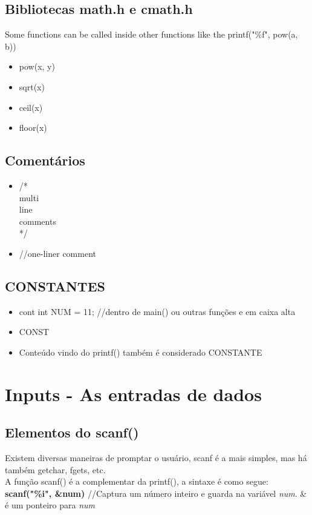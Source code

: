 \documentclass[12pt,a4paper]{article} %
\begin{document}
\subsection{Bibliotecas math.h e cmath.h}
Some functions can be called inside other functions like the printf("\%f", pow(a, b))
\begin{itemize}
\item pow(x, y)
\item sqrt(x)
\item ceil(x)
\item floor(x)
\end{itemize}

\subsection{Comentários}
\begin{itemize}
\item /*\\multi\\line\\comments\\ */
\item //one-liner comment
\end{itemize}

\subsection{CONSTANTES}
\begin{itemize}
\item cont int NUM = 11; //dentro de main() ou outras funções e em caixa alta
\item CONST 
\item Conteúdo vindo do printf() também é considerado CONSTANTE
\end{itemize}

\section{Inputs - As entradas de dados}

\subsection{Elementos do scanf()}
Existem diversas maneiras de promptar o usuário, scanf é a mais simples, mas há também getchar, fgets, etc.\\
A função scanf() é a complementar da printf(), a sintaxe é como segue:\\
\textbf{scanf("\%i", \&num)} //Captura um número inteiro e guarda na variável \textit{num}. \& é um ponteiro para \textit{num}
\end{document}
